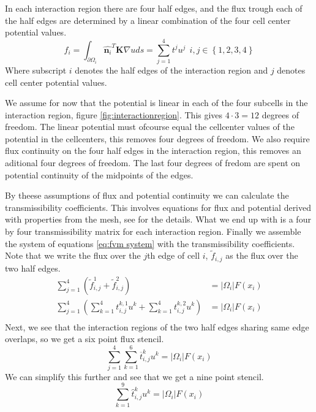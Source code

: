 \documentclass[../Main/main.tex]{subfiles}
\begin{document}
In each interaction region there are four half edges, and the flux trough each of the half edges are determined by a linear combination of the four cell center potential values. 
\begin{equation*}
	f_i = \int_{\partial \Omega_i}\hat{\pmb{n}_i}^T \pmb{K} \nabla u ds = \sum_{j=1}^4 t^j u^j \ \ i,j \in \left \{ 1,2,3,4 \right \}
\end{equation*}
Where subscript $i$ denotes the half edges of the interaction region and $j$ denotes cell center potential values.
\par
We assume for now that the potential is linear in each of the four subcells in the interaction region, figure  \ref{fig:interactionregion}. This gives $4\cdot 3 = 12$ degrees of freedom. The linear potential must ofcourse equal the cellcenter values of the potential in the cellcenters, this removes four degrees of freedom. We also require flux continuity on the four half edges in the interaction region, this removes an aditional four degrees of freedom. The last four degrees of fredom are spent on potential continuity of the midpoints of the edges. 
\par
By theese assumptions of flux and potential continuity we can calculate the transmissibility coefficients. This involves equations for flux and potential derived with properties from the mesh, see \cite{Aavatsmark2002} for the details. What we end up with is a four by four transmissibility matrix for each interaction region. Finally we assemble the system of equations \eqref{eq:fvm system} with the transmissibility coefficients. Note that we write the flux over the $j$th edge of cell $i$, $\tilde{f}_{i,j}$ as the flux over the two half edges.
\begin{equation*}
	\begin{aligned}
		\sum_{j=1}^4 (\tilde{f}_{i,j}^1 + \tilde{f}_{i,j}^2) &= |\Omega_i|F(x_i) \\
		\sum_{j=1}^4 (\sum_{k=1}^4 t^{k,1}_{i,j}u^k + \sum_{k=1}^4 t^{k,2}_{i,j}u^k)&= |\Omega_i|F(x_i)\\
	\end{aligned}
\end{equation*}
Next, we see that the interaction regions of the two half edges sharing same edge overlaps, so we get a six point flux stencil.
\begin{equation*}
	\sum_{j=1}^4 \sum_{k=1}^6 \overline{t}^{k}_{i,j}u^k = |\Omega_i|F(x_i)
\end{equation*}
We can simplify this further and see that we get a nine point stencil.
\begin{equation*}
	\sum_{k=1}^9 \hat{t}^{k}_{i,j}u^k = |\Omega_i|F(x_i)
\end{equation*}
\end{document}
